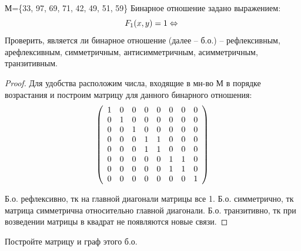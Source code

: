 \begin{problem}
    
    М=\{33, 97, 69, 71, 42, 49, 51, 59\}\newline
	Бинарное отношение задано выражением: \newline
   $$ F_{1}(x,y)=1\Leftrightarrow\newline$$
 \newline
 Проверить, является ли бинарное отношение (далее -- б.о.) -- рефлексивным, арефлексивным, симметричным, антисимметричным, асимметричным, транзитивным.
\end{problem}

\begin{proof}
    Для удобства расположим числа, входящие в мн-во М в порядке возрастания и построим матрицу для данного бинарного отношения:
	$$ \left( \begin{array}{c c c c c c c c } 
 
 1 & 0 & 0 & 0 & 0 & 0 & 0 & 0 \\ 

 0 & 1 & 0 & 0 & 0 & 0 & 0 & 0 \\

 0 & 0 & 1 & 0 & 0 & 0 & 0 & 0 \\
 
 0 & 0 & 0 & 1 & 1 & 0 & 0 & 0 \\
 
 0 & 0 & 0 & 1 & 1 & 0 & 0 & 0 \\
 
 0 & 0 & 0 & 0 & 0 & 1 & 1 & 0 \\
 
 0 & 0 & 0 & 0 & 0 & 1 & 1 & 0 \\
 
 0 & 0 & 0 & 0 & 0 & 0 & 0 & 1  \end {array} \right) $$

 Б.о. рефлексивно, тк на главной диагонали матрицы все 1.
    \newline
     Б.о. симметрично, тк матрица симметрична относительно главной диагонали.
    \newline
    Б.о. транзитивно, тк при возведении матрицы в квадрат не появляются новые связи.
\end{proof}

\begin{problem}
	Постройте матрицу и граф этого б.о.
\end{problem}

